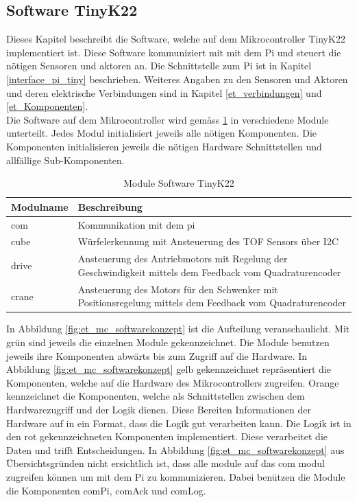 \documentclass[../../main.tex]{subfiles}
\begin{document}
    \subsection{Software TinyK22} \label{et_software_tiny}
    Dieses Kapitel beschreibt die Software, welche auf dem Mikrocontroller TinyK22 implementiert ist. Diese Software kommuniziert mit mit dem Pi und steuert die nötigen Sensoren und aktoren an. Die Schnittstelle zum Pi ist in Kapitel \ref{interface_pi_tiny} beschrieben. Weiteres Angaben zu den Sensoren und Aktoren und deren elektrische Verbindungen sind in Kapitel \ref{et_verbindungen} und \ref{et_Komponenten}.\\
    Die Software auf dem Mikrocontroller wird gemäss \ref{tab:et_mc_softwarekonzept} in verschiedene Module unterteilt. Jedes Modul initialisiert jeweils alle nötigen Komponenten. Die Komponenten initialisieren jeweils die nötigen Hardware Schnittstellen und allfällige Sub-Komponenten.\\

    \begin{table}[H]
        \centering
        \begin{tabular}{|l|p{12cm}|}
        \hline
        \textbf{Modulname} & \textbf{Beschreibung}    \\ \hline
        com   & Kommunikation mit dem pi                                                                                 \\ \hline
        cube  & Würfelerkennung mit Ansteuerung des TOF Sensors über I2C                                                 \\ \hline
        drive & Ansteuerung des Antriebmotors mit Regelung der Geschwindigkeit mittels dem Feedback vom Quadraturencoder \\ \hline
        crane & Ansteuerung des Motors für den Schwenker mit Positionsregelung mittels dem Feedback vom Quadraturencoder \\ \hline
        \end{tabular}
        \caption{Module Software TinyK22}
        \label{tab:et_mc_softwarekonzept}
    \end{table}


    In Abbildung \ref{fig:et_mc_softwarekonzept} ist die Aufteilung veranschaulicht. Mit grün sind jeweils die einzelnen Module gekennzeichnet. Die Module benutzen jeweils ihre Komponenten abwärts bis zum Zugriff auf die Hardware. In Abbildung \ref{fig:et_mc_softwarekonzept} gelb gekennzeichnet repräsentiert die Komponenten, welche auf die Hardware des Mikrocontrollers zugreifen. Orange kennzeichnet die Komponenten, welche als Schnittstellen zwischen dem Hardwarezugriff und der Logik dienen. Diese Bereiten Informationen der Hardware auf in ein Format, dass die Logik gut verarbeiten kann. Die Logik ist in den rot gekennzeichneten Komponenten implementiert. Diese verarbeitet die Daten und trifft Entscheidungen.
    In Abbildung \ref{fig:et_mc_softwarekonzept} aus Übersichtsgründen nicht ersichtlich ist, dass alle module auf das com modul zugreifen können um mit dem Pi zu kommunizieren. Dabei benützen die Module die Komponenten comPi, comAck und comLog.\\
\end{document}
